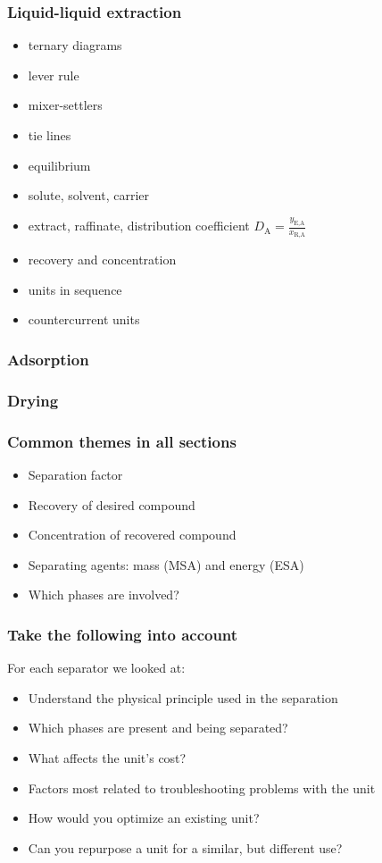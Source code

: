 {
\begin{frame}\frametitle{Liquid-liquid extraction}
	{}
	\begin{itemize}
		\item	ternary diagrams
		\item	lever rule
		\item	mixer-settlers
		\item	tie lines
		\item	equilibrium
		\item	solute, solvent, carrier
		\item	extract, raffinate, distribution coefficient $D_\text{A} = \displaystyle \frac{y_\text{E,A}}{x_\text{R,A}}$
		\item	recovery and concentration
		\item	units in sequence
		\item	countercurrent units
	\end{itemize}
\end{frame}
}

\begin{frame}\frametitle{Adsorption}
	
\end{frame}

\begin{frame}\frametitle{Drying}
	
\end{frame}

\begin{frame}\frametitle{Common themes in all sections}
	\begin{itemize}
		\item	Separation factor
		\item	Recovery of desired compound
		\item	Concentration of recovered compound
		\item	Separating agents: mass (MSA) and energy (ESA)
		\item	Which phases are involved?
	\end{itemize}
\end{frame}

\begin{frame}\frametitle{Take the following into account}
	For each separator we looked at:
	\begin{itemize}
		\item	Understand the physical principle used in the separation
		\item	Which phases are present and being separated?
		\item	What affects the unit's cost?
		\item	Factors most related to troubleshooting problems with the unit
		\item	How would you optimize an existing unit?
		\item	Can you repurpose a unit for a similar, but different use?
	\end{itemize}
\end{frame}


